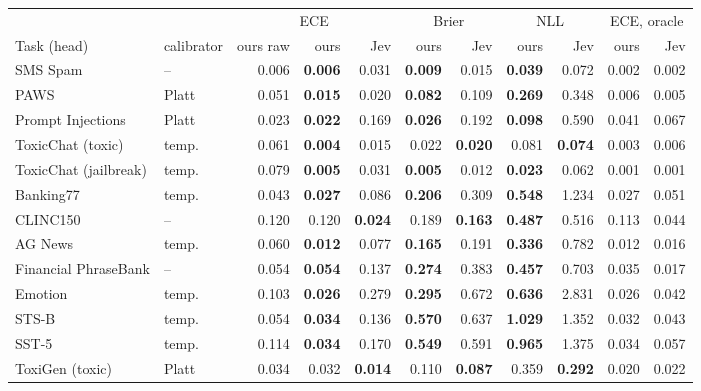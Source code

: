 \begin{table}[t]
\centering\small
\setlength{\tabcolsep}{4pt}
\begin{tabular}{llrrrrrrrrr}
\toprule
 & & \multicolumn{3}{c}{ECE} & \multicolumn{2}{c}{Brier} & \multicolumn{2}{c}{NLL} & \multicolumn{2}{c}{ECE, oracle} \\
\cmidrule(lr){3-5}\cmidrule(lr){6-7}\cmidrule(lr){8-9}\cmidrule(lr){10-11}
Task (head) & calibrator & ours raw & ours & Jev & ours & Jev & ours & Jev & ours & Jev \\
\midrule
SMS Spam & -- & 0.006 & \textbf{0.006} & 0.031 & \textbf{0.009} & 0.015 & \textbf{0.039} & 0.072 & 0.002 & 0.002 \\
PAWS & Platt & 0.051 & \textbf{0.015} & 0.020 & \textbf{0.082} & 0.109 & \textbf{0.269} & 0.348 & 0.006 & 0.005 \\
Prompt Injections & Platt & 0.023 & \textbf{0.022} & 0.169 & \textbf{0.026} & 0.192 & \textbf{0.098} & 0.590 & 0.041 & 0.067 \\
ToxicChat (toxic) & temp. & 0.061 & \textbf{0.004} & 0.015 & 0.022 & \textbf{0.020} & 0.081 & \textbf{0.074} & 0.003 & 0.006 \\
ToxicChat (jailbreak) & temp. & 0.079 & \textbf{0.005} & 0.031 & \textbf{0.005} & 0.012 & \textbf{0.023} & 0.062 & 0.001 & 0.001 \\
\midrule
Banking77 & temp. & 0.043 & \textbf{0.027} & 0.086 & \textbf{0.206} & 0.309 & \textbf{0.548} & 1.234 & 0.027 & 0.051 \\
CLINC150 & -- & 0.120 & 0.120 & \textbf{0.024} & 0.189 & \textbf{0.163} & \textbf{0.487} & 0.516 & 0.113 & 0.044 \\
AG News & temp. & 0.060 & \textbf{0.012} & 0.077 & \textbf{0.165} & 0.191 & \textbf{0.336} & 0.782 & 0.012 & 0.016 \\
Financial PhraseBank & -- & 0.054 & \textbf{0.054} & 0.137 & \textbf{0.274} & 0.383 & \textbf{0.457} & 0.703 & 0.035 & 0.017 \\
Emotion & temp. & 0.103 & \textbf{0.026} & 0.279 & \textbf{0.295} & 0.672 & \textbf{0.636} & 2.831 & 0.026 & 0.042 \\
\midrule
STS-B & temp. & 0.054 & \textbf{0.034} & 0.136 & \textbf{0.570} & 0.637 & \textbf{1.029} & 1.352 & 0.032 & 0.043 \\
SST-5 & temp. & 0.114 & \textbf{0.034} & 0.170 & \textbf{0.549} & 0.591 & \textbf{0.965} & 1.375 & 0.034 & 0.057 \\
ToxiGen (toxic) & Platt & 0.034 & 0.032 & \textbf{0.014} & 0.110 & \textbf{0.087} & 0.359 & \textbf{0.292} & 0.020 & 0.022 \\

\end{tabular}
\end{table}
